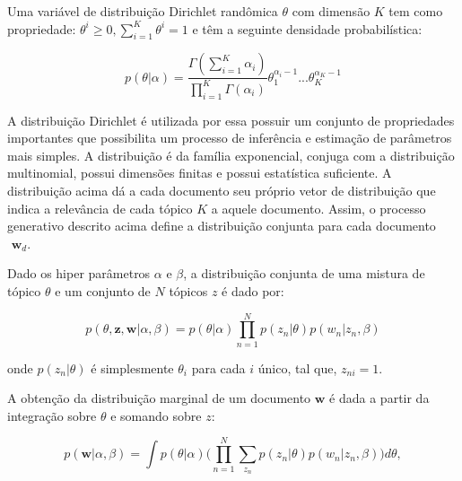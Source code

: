 \documentclass[12pt,a4paper]{article}
\begin{document}
  
  Uma variável de distribuição Dirichlet randômica $\theta$ com dimensão $K$ tem como propriedade: $\theta ^i \geq 0, \displaystyle\sum_{i=1}^{K} \theta ^i = 1$ e têm a seguinte densidade probabilística:
  
  \begin{equation}
  p(\theta|\alpha) = \frac{\Gamma(\displaystyle\sum_{i=1}^{K} \alpha _i)}{\displaystyle\prod_{i=1}^{K} \Gamma(\alpha _i)} \theta _1 ^{\alpha _i - 1} ...  \theta _K ^{\alpha _K - 1}
  \end{equation}
  
  A distribuição Dirichlet é utilizada por essa possuir um conjunto de propriedades importantes que possibilita um processo de inferência e estimação de parâmetros mais simples.
   A distribuição é da família exponencial, conjuga com a distribuição multinomial, possui dimensões finitas e possui estatística suficiente.
   A distribuição  acima dá a cada documento seu próprio vetor de distribuição que indica a relevância de cada tópico $K$ a aquele documento.
   Assim, o processo generativo descrito acima define a distribuição conjunta para cada documento $\textbf{ w}_d$.
  
  Dado os hiper parâmetros $\alpha$ e $\beta$, a distribuição conjunta de uma mistura de tópico $\theta$ e um conjunto de $N$ tópicos $z$ é dado por:
  
  \begin{equation}
  p(\theta,\textbf{z},\textbf{w}|\alpha,\beta) = p(\theta|\alpha) \prod_{n=1}^{N} p(z_n|\theta)p(w_n|z_n,\beta)
  \end{equation}
  
  onde $p(z_n | \theta)$ é simplesmente $\theta _i$ para cada $i$ único,
   tal que, $z_{ni}=1$.
   
  A obtenção da distribuição marginal de um documento $\textbf{w}$ é dada a partir da integração sobre $\theta$ e somando sobre $z$:
  
  \begin{equation}
  p(\textbf{w}|\alpha,\beta)=\int{p(\theta|\alpha)\Bigg(\prod_{n=1}^{N}\sum_{z_n} p(z_n|\theta)p(w_n|z_n,\beta)\Bigg)d\theta},
  \end{equation}
  
\end{document}
